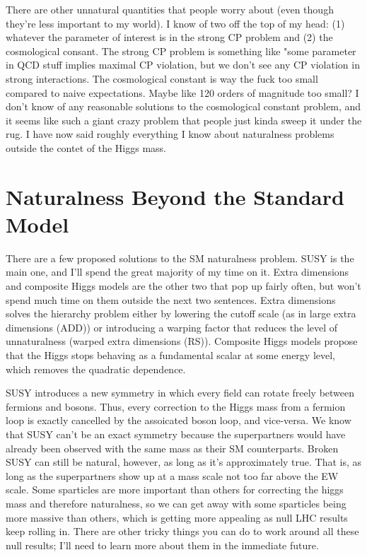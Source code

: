 \documentclass[12pt]{article}
\begin{document}
    There are other unnatural quantities that people worry about (even though they're less important to my world). I know of two off the top of my head: (1) whatever the parameter of interest is in the strong CP problem and (2) the cosmological consant. The strong CP problem is something like "some parameter in QCD stuff implies maximal CP violation, but we don't see any CP violation in strong interactions. The cosmological constant is way the fuck too small compared to naive expectations. Maybe like 120 orders of magnitude too small? I don't know of any reasonable solutions to the cosmological constant problem, and it seems like such a giant crazy problem that people just kinda sweep it under the rug. I have now said roughly everything I know about naturalness problems outside the contet of the Higgs mass.
    
\section{Naturalness Beyond the Standard Model}
    There are a few proposed solutions to the SM naturalness problem. SUSY is the main one, and I'll spend the great majority of my time on it. Extra dimensions and composite Higgs models are the other two that pop up fairly often, but won't spend much time on them outside the next two sentences. Extra dimensions solves the hierarchy problem either by lowering the cutoff scale (as in large extra dimensions (ADD)) or introducing a warping factor that reduces the level of unnaturalness (warped extra dimensions (RS)). Composite Higgs models propose that the Higgs stops behaving as a fundamental scalar at some energy level, which removes the quadratic dependence.

    SUSY introduces a new symmetry in which every field can rotate freely between fermions and bosons. Thus, every correction to the Higgs mass from a fermion loop is exactly cancelled by the assoicated boson loop, and vice-versa. We know that SUSY can't be an exact symmetry because the superpartners would have already been observed with the same mass as their SM counterparts. Broken SUSY can still be natural, however, as long as it's approximately true. That is, as long as the superpartners show up at a mass scale not too far above the EW scale. Some sparticles are more important than others for correcting the higgs mass and therefore naturalness, so we can get away with some sparticles being more massive than others, which is getting more appealing as null LHC results keep rolling in. There are other tricky things you can do to work around all these null results; I'll need to learn more about them in the immediate future.
\end{document}
